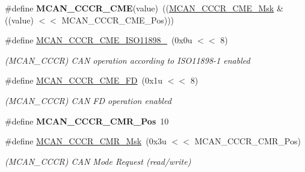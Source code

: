 \begin{DoxyCompactItemize}
\mbox{\label{group__SAME70__MCAN_ga10ecca0cd9635bb3dbc42aa6c050608d}} 
\#define {\bfseries M\+C\+A\+N\+\_\+\+C\+C\+C\+R\+\_\+\+C\+ME}(value)~((\mbox{\hyperlink{group__SAMV71__MCAN_ga101af3cbe56bc9cf8bad6cc04301f10d}{M\+C\+A\+N\+\_\+\+C\+C\+C\+R\+\_\+\+C\+M\+E\+\_\+\+Msk}} \& ((value) $<$$<$ M\+C\+A\+N\+\_\+\+C\+C\+C\+R\+\_\+\+C\+M\+E\+\_\+\+Pos)))
\item 
\mbox{\label{group__SAME70__MCAN_gadac4c5f8dd13bf01ba7136e48eae97d0}} 
\#define \mbox{\hyperlink{group__SAME70__MCAN_gadac4c5f8dd13bf01ba7136e48eae97d0}{M\+C\+A\+N\+\_\+\+C\+C\+C\+R\+\_\+\+C\+M\+E\+\_\+\+I\+S\+O11898\+\_}}~(0x0u $<$$<$ 8)
\begin{DoxyCompactList}\small\item\em (M\+C\+A\+N\+\_\+\+C\+C\+CR) C\+AN operation according to I\+S\+O11898-\/1 enabled \end{DoxyCompactList}\item 
\mbox{\label{group__SAME70__MCAN_gacaf295bcefa3292a8c073d38349305ae}} 
\#define \mbox{\hyperlink{group__SAME70__MCAN_gacaf295bcefa3292a8c073d38349305ae}{M\+C\+A\+N\+\_\+\+C\+C\+C\+R\+\_\+\+C\+M\+E\+\_\+\+FD}}~(0x1u $<$$<$ 8)
\begin{DoxyCompactList}\small\item\em (M\+C\+A\+N\+\_\+\+C\+C\+CR) C\+AN FD operation enabled \end{DoxyCompactList}\item 
\mbox{\label{group__SAME70__MCAN_ga7ad8298249fb9b4963440bdeddf29571}} 
\#define {\bfseries M\+C\+A\+N\+\_\+\+C\+C\+C\+R\+\_\+\+C\+M\+R\+\_\+\+Pos}~10
\item 
\mbox{\label{group__SAME70__MCAN_ga4f1990ddca877eced483f7aa6eba8611}} 
\#define \mbox{\hyperlink{group__SAME70__MCAN_ga4f1990ddca877eced483f7aa6eba8611}{M\+C\+A\+N\+\_\+\+C\+C\+C\+R\+\_\+\+C\+M\+R\+\_\+\+Msk}}~(0x3u $<$$<$ M\+C\+A\+N\+\_\+\+C\+C\+C\+R\+\_\+\+C\+M\+R\+\_\+\+Pos)
\begin{DoxyCompactList}\small\item\em (M\+C\+A\+N\+\_\+\+C\+C\+CR) C\+AN Mode Request (read/write) \end{DoxyCompactList}\item 
\mbox{\label{group__SAME70__MCAN_ga507c30ed0d424ca6093048a54785f8cb}} 

\end{DoxyCompactItemize}
